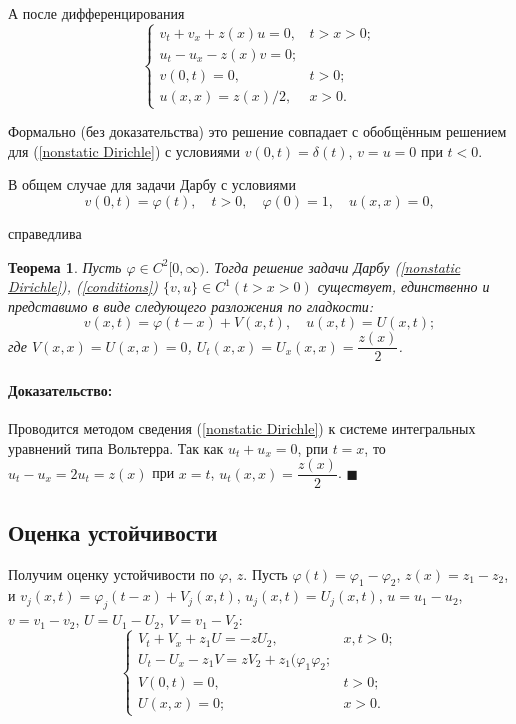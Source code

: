\documentclass{article}
\newtheorem{theorem}{Теорема}
\newenvironment{proof}{\paragraph{Доказательство:}}{\hfill$\blacksquare$}
\begin{document}
А после дифференцирования
\begin{equation*}
\begin{cases}
	v_t + v_x + z(x) u = 0, & t > x > 0;\\
	u_t - u_x - z(x) v = 0; \\
	v(0,t) = 0, & t >0;\\
	u(x,x) = z(x) /2, & x > 0.
\end{cases}
\end{equation*}

Формально (без доказательства) это решение совпадает с обобщённым решением для (\ref{nonstatic Dirichle}) с условиями $v(0,t) = \delta(t)$, $v = u =0$ при $t<0$.

В общем случае для задачи Дарбу с условиями 
\begin{equation}
	v(0,t) = \varphi(t), \quad t>0, 
	\quad \varphi(0) = 1, \quad u(x,x) = 0,
	\label{conditions}
\end{equation}

справедлива

\begin{theorem}
Пусть $\varphi \in C^2[0,\infty)$. Тогда решение задачи Дарбу (\ref{nonstatic Dirichle}), (\ref{conditions}) $\{v,u\} \in C^1(t > x >0)$ существует, единственно и представимо в виде следующего разложения по гладкости:
\begin{equation*}
 	v(x,t) = \varphi(t-x) + V(x,t), \quad u(x,t) = U(x,t);
 \end{equation*}
где $V(x,x) = U(x,x) = 0$, $U_t(x,x) = U_x(x,x) = \dfrac{z(x)}{2}$. 
\end{theorem}
\begin{proof}
Проводится методом сведения (\ref{nonstatic Dirichle}) к системе интегральных уравнений типа Вольтерра.
Так как $u_t + u_x = 0$, рпи $t=x$, то $u_t - u_x = 2 u_t = z(x)$ при $x = t$, $u_t(x,x) = \dfrac{z(x)}{2}$.
\end{proof}

\subsection*{Оценка устойчивости}

Получим оценку устойчивости по $\varphi$, $z$.
Пусть $\varphi(t) = \varphi_1 - \varphi_2$, $z(x) = z_1 - z_2$, и $v_j(x,t) = \varphi_j(t-x) + V_j(x,t)$, $ u_j(x,t) = U_j(x,t)$, $u = u_1 -u_2$, $v = v_1 -v_2$, $U = U_1 - U_2$, $V = v_1 - V_2$:
\begin{equation*}
\begin{cases}
	V_t + V_x + z_1 U = - z U_2, & x,t>0;\\
	U_t - U_x - z_1 V = z V_2 + z_1(\varphi_1 \varphi_2;\\
	V(0,t) = 0, & t > 0;\\
	U(x,x) = 0; & x> 0.
\end{cases}
\end{equation*}
\end{document}

